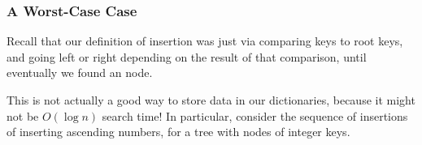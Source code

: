 \documentclass[aspectratio=169, handout]{beamer}
\begin{document}
\begin{frame}[fragile]
  \frametitle{A Worst-Case Case}

  Recall that our definition of insertion was just via comparing keys to
  root keys, and going left or right depending on the result of that comparison,
  until eventually we found an  node.

  \pause
  \vspace{\fill}

  This is not actually a good way to store data in our dictionaries, because it
  might not be $O(\log n)$ search time! In particular, consider the sequence
  of insertions of inserting ascending numbers, for a tree with nodes of integer
  keys.

  \pause
  \vspace{\fill}


\end{frame}
\end{document}
